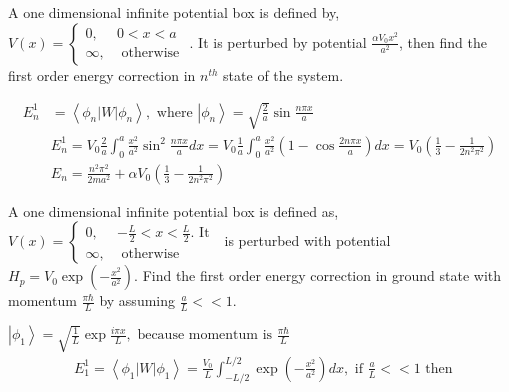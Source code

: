  \begin{enumerate}
 		\begin{minipage}{\textwidth}
 		\item A one dimensional infinite potential box is defined by, $V(x)=\left\{\begin{array}{ll}0, & 0<x<a \\ \infty, & \text { otherwise }\end{array}\right.$. It is perturbed by potential $\frac{\alpha V_{0} x^{2}}{a^{2}}$, then find the first order energy correction in $n^{t h}$ state of the system.
 	\end{minipage}
 	\begin{answer}
 		\begin{align*}
 		 	E_{n}^{1}&=\left\langle\phi_{n}|W| \phi_{n}\right\rangle, \text { where }\left|\phi_{n}\right\rangle=\sqrt{\frac{2}{a}} \sin \frac{n \pi x}{a}\\
 		&E_{n}^{1}=V_{0} \frac{2}{a} \int_{0}^{a} \frac{x^{2}}{a^{2}} \sin ^{2} \frac{n \pi x}{a} d x=V_{0} \frac{1}{a} \int_{0}^{a} \frac{x^{2}}{a^{2}}\left(1-\cos \frac{2 n \pi x}{a}\right) d x=V_{0}\left(\frac{1}{3}-\frac{1}{2 n^{2} \pi^{2}}\right) \\
 		&E_{n}=\frac{n^{2} \pi^{2}}{2 m a^{2}}+\alpha V_{0}\left(\frac{1}{3}-\frac{1}{2 n^{2} \pi^{2}}\right)
 	\end{align*}	
 	\end{answer}
 	\begin{minipage}{\textwidth}
 	\item A one dimensional infinite potential box is defined as, $V(x)= \begin{cases}0, & -\frac{L}{2}<x<\frac{L}{2} . \text { It } \\ \infty, & \text { otherwise }\end{cases}$ is perturbed with potential $H_{p}=V_{0} \exp \left(-\frac{x^{2}}{a^{2}}\right) .$ Find the first order energy correction in ground state with momentum $\frac{\pi \hbar}{L}$ by assuming $\frac{a}{L}<<1$.
 \end{minipage}
 \begin{answer}
  $\left|\phi_{1}\right\rangle=\sqrt{\frac{1}{L}} \exp \frac{i \pi x}{L}, \text { because momentum is } \frac{\pi \hbar}{L}$\\
  \begin{align*}
  	&E_{1}^{1}=\left\langle\phi_{1}|W| \phi_{1}\right\rangle=\frac{V_{0}}{L} \int_{-L / 2}^{L / 2} \exp \left(-\frac{x^{2}}{a^{2}}\right) d x, \text { if } \frac{a}{L}<<1 \text { then } \\

\end{align*}
\end{answer}
\end{enumerate}

